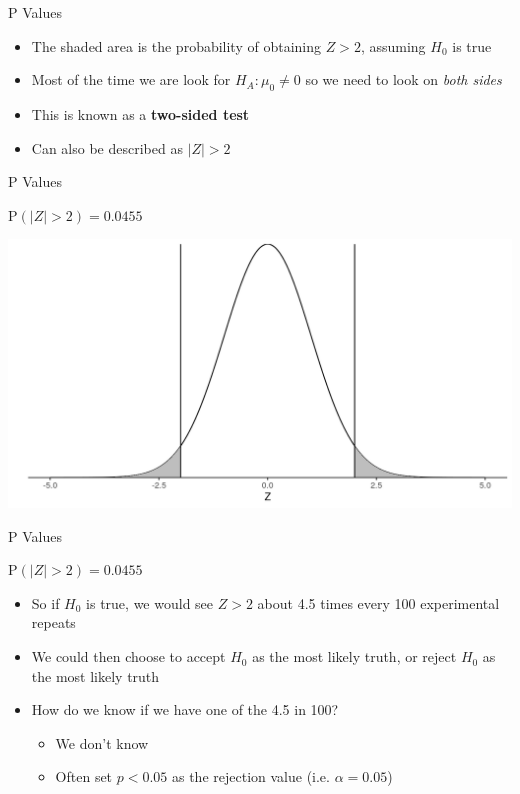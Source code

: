\documentclass[aspectratio=169,11pt]{beamer}
\begin{document}
\begin{frame}{P Values}
	\begin{itemize}
		\item The shaded area is the probability of obtaining $Z > 2$, assuming $H_0$ is true
		\item Most of the time we are look for $H_A: \mu_0 \neq 0$ so we need to look on \textit{both sides}
		\item This is known as a \textbf{two-sided test}
		\item Can also be described as $|Z| > 2$
	\end{itemize}
\end{frame}

\begin{frame}{P Values}

P$(|Z| > 2) = 0.0455$\\[5mm]

	\begin{center}
		\includegraphics[scale=0.5]{figures/zAbs2.png} 
	\end{center}

\end{frame}

\begin{frame}{P Values}

P$(|Z| > 2) = 0.0455$\\[5mm]

	\begin{itemize}
		\item So if $H_0$ is true, we would see $Z > 2$ about 4.5 times every 100 experimental repeats
		\item We could then choose to accept $H_0$ as the most likely truth, or reject $H_0$ as the most likely truth
		\item How do we know if we have one of the 4.5 in 100?
		\pause
		\begin{itemize}
			\item We don't know
			\item Often set $p < 0.05$ as the rejection value (i.e. $\alpha = 0.05$)
		\end{itemize}
	\end{itemize}

\end{frame}
\end{document}
